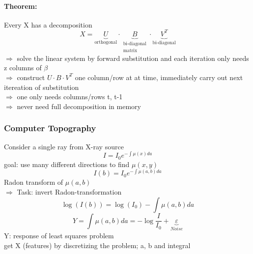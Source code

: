 \documentclass[11pt]{article}
\begin{document}
\begin{itemize}
      \paragraph{Theorem:} Every X has a decomposition
      \begin{equation*}
        X = \underbrace{U}_{\text{orthogonal}} \cdot \underbrace{B}_
        {\substack{\text{bi-diagonal} \\ \text{matrix}}} \cdot \underbrace{V^T}_
        {\text{bi-diagonal}}
      \end{equation*}
      $\Rightarrow$ solve the linear system by forward substitution
      and each iteration only needs z columns of $\beta$ \\
      $\Rightarrow$ construct $U \cdot B \cdot V^T$ one column/row
      at at time, immediately carry out next itereation of substitution \\
      $\Rightarrow$ one only needs columns/rows t, t-1\\
      $\Rightarrow$ never need full decomposition in memory
      \subsubsection{Computer Topography}
      Consider a single ray from X-ray source
      \begin{equation*}
        I = I_0e^{-\int\mu(x)da}
      \end{equation*}
      goal: use many different directions to find $\mu(x,y)$
      \begin{equation*}
        \boxed{I(b)=I_0e^{-\int \mu(a,b)da}}
      \end{equation*}
      Radon transform of $\mu(a,b)$ \\
      $\Rightarrow$ Task: invert Radon-transformation
      \begin{equation*}
      \log(I(b)) = \log(I_0) - \int \mu(a,b)da
      \end{equation*}
      \begin{equation*}
        Y = \int \mu(a,b)da = -\log \frac{I}{I_0} + \underbrace{\varepsilon}_{Noise}
      \end{equation*}
      Y: response of least squares problem \\
      get X (features) by discretizing the problem; a, b and integral


\end{itemize}
\end{document}
